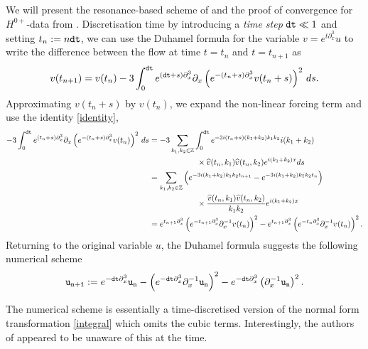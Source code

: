 We will present the resonance-based scheme of \cite{HofmanovaSchratz2017} and the proof of convergence for $H^{0+}$-data from \cite{RoussetSchratz2022}. Discretisation time by introducing a \textit{time step} $\mathtt{dt} \ll 1$ and setting $t_n := n \mathtt{dt}$, we can use the Duhamel formula for the variable $v = e^{t \partial_x^3} u$ to write the difference between the flow at time $t = t_n$ and $t = t_{n + 1}$ as 
    \begin{equation}
        v(t_{n + 1}) 
            = v(t_n) - 3 \int_0^{\mathtt{dt}} e^{(\mathtt{dt} + s) \partial_x^3} \partial_x \left( e^{-(t_n + s) \partial_x^3} v(t_n + s) \right)^2 \, ds.
    \end{equation}
Approximating $v(t_n + s)$ by $v(t_n)$, we expand the non-linear forcing term and use the identity \eqref{identity},
    \begin{align*}
        -3\int_0^{\mathtt{dt}} e^{(t_n + s) \partial_x^3} \partial_x \left( e^{-(t_n + s) \partial_x^3} v(t_n) \right)^2 \, ds
            &= - 3 \sum_{k_1, k_2 \in \mathbb Z} \int_0^{\mathtt{dt}} e^{-3i (t_n + s)(k_1 + k_2) k_1 k_2} i(k_1 + k_2) \\
            &\qquad\qquad \qquad \times \widehat v(t_n, k_1) \widehat v(t_n, k_2) e^{i (k_1 + k_2)x} ds \\
            &=  \sum_{k_1, k_2 \in \mathbb Z} \left( e^{-3i (k_1 + k_2)k_1k_2 t_{n + 1}} - e^{-3i (k_1 + k_2)k_1k_2 t_{n}} \right) \\ 
            &\qquad\qquad\qquad\times\frac{\widehat v(t_n, k_1) \widehat v(t_n, k_2)}{k_1 k_2} e^{i(k_1 + k_2)x} \\
            &= e^{t_{n + 1}\partial_x^3} \left( e^{-t_{n + 1} \partial_x^3} \partial_x^{-1} v(t_n) \right)^2 - e^{t_{n + 1}\partial_x^3} \left( e^{-t_{n} \partial_x^3} \partial_x^{-1} v(t_n) \right)^2.
    \end{align*}
Returning to the original variable $u$, the Duhamel formula suggests the following numerical scheme 
    \begin{equation}\label{eq:numerical}
        \mathtt{u_{n  +1}} 
            := e^{- \mathtt{dt} \partial_x^3} \mathtt{u_n} - \left(e^{-\mathtt{dt} \partial_x^3} \partial_x^{-1} \mathtt{u_n}\right)^2 - e^{-\mathtt{dt} \partial_x^3} \left(\partial_x^{-1} \mathtt{u_n}\right)^2.
    \end{equation}

\begin{remark}
    The numerical scheme is essentially a time-discretised version of the normal form transformation \eqref{integral} which omits the cubic terms. Interestingly, the authors of \cite{HofmanovaSchratz2017} appeared to be unaware of this at the time. 
\end{remark}

